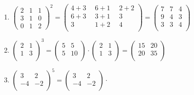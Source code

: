\begin{solution}

\begin{enumerate}[label=\alph*)]
	\item {
\ensuremath{
	\begin{pmatrix}
		2 & 1 & 1\\
		3 & 1 & 0\\
		0 & 1 & 2
	\end{pmatrix}^2 = 
	\begin{pmatrix}
		4+3   \enspace & 6+1   \enspace & 2+2\\
		6+3   \enspace & 3+1   \enspace & 3\\
		3     \enspace & 1+2   \enspace & 4\\
	\end{pmatrix} = 
	\begin{pmatrix}
		7 & 7 & 4\\
		9 & 4 & 3\\
		3 & 3 & 4\\
	\end{pmatrix}
}
}
	\item{
\ensuremath{
	\begin{pmatrix}
		2 & 1\\
		1 & 3\\
	\end{pmatrix}^3 =
	\begin{pmatrix}
		5 & 5\\
		5 & 10\\
	\end{pmatrix} \cdot
	\begin{pmatrix}
		2 & 1\\
		1 & 3\\
	\end{pmatrix} = 
	\begin{pmatrix}
		15 & 20\\
		20 & 35\\
	\end{pmatrix}
}
}
\item{
\ensuremath{
	\begin{pmatrix}
		3 & 2 \\
		-4 & -2 \\
	\end{pmatrix}^5 = 
	\begin{pmatrix}
		3 & 2 \\
		-4 & -2 \\
	\end{pmatrix} \cdot
}}
\end{enumerate}
\end{solution}
